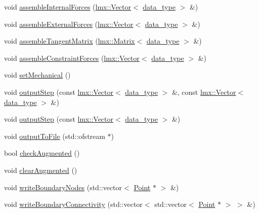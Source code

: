 \begin{DoxyCompactItemize}
\item 
void \hyperlink{classmknix_1_1_system_a045a56838910627b66dc981205358b78}{assemble\+Internal\+Forces} (\hyperlink{classlmx_1_1_vector}{lmx\+::\+Vector}$<$ \hyperlink{namespacemknix_a16be4b246fbf2cceb141e3a179111020}{data\+\_\+type} $>$ \&)
\item 
void \hyperlink{classmknix_1_1_system_a3f8ef449040805bcc58e3a36a6276888}{assemble\+External\+Forces} (\hyperlink{classlmx_1_1_vector}{lmx\+::\+Vector}$<$ \hyperlink{namespacemknix_a16be4b246fbf2cceb141e3a179111020}{data\+\_\+type} $>$ \&)
\item 
void \hyperlink{classmknix_1_1_system_a4311a423d3a9d7072c0d49031e3bba32}{assemble\+Tangent\+Matrix} (\hyperlink{classlmx_1_1_matrix}{lmx\+::\+Matrix}$<$ \hyperlink{namespacemknix_a16be4b246fbf2cceb141e3a179111020}{data\+\_\+type} $>$ \&)
\item 
void \hyperlink{classmknix_1_1_system_a24b1a9bcb9279bbb2384d2bbf94b157c}{assemble\+Constraint\+Forces} (\hyperlink{classlmx_1_1_vector}{lmx\+::\+Vector}$<$ \hyperlink{namespacemknix_a16be4b246fbf2cceb141e3a179111020}{data\+\_\+type} $>$ \&)
\item 
void \hyperlink{classmknix_1_1_system_ad884fcd0fba58c799a88de4ee1f59108}{set\+Mechanical} ()
\item 
void \hyperlink{classmknix_1_1_system_a22677dbc55080b00290652416ee8bb90}{output\+Step} (const \hyperlink{classlmx_1_1_vector}{lmx\+::\+Vector}$<$ \hyperlink{namespacemknix_a16be4b246fbf2cceb141e3a179111020}{data\+\_\+type} $>$ \&, const \hyperlink{classlmx_1_1_vector}{lmx\+::\+Vector}$<$ \hyperlink{namespacemknix_a16be4b246fbf2cceb141e3a179111020}{data\+\_\+type} $>$ \&)
\item 
void \hyperlink{classmknix_1_1_system_ac161fd48c06a65cfa7b9e27dfbad3f47}{output\+Step} (const \hyperlink{classlmx_1_1_vector}{lmx\+::\+Vector}$<$ \hyperlink{namespacemknix_a16be4b246fbf2cceb141e3a179111020}{data\+\_\+type} $>$ \&)
\item 
void \hyperlink{classmknix_1_1_system_af08300f28c64abfc4065888a643b4bbf}{output\+To\+File} (std\+::ofstream $\ast$)
\item 
bool \hyperlink{classmknix_1_1_system_a477db1887fa5858d2708f50397aa6ebf}{check\+Augmented} ()
\item 
void \hyperlink{classmknix_1_1_system_afbf67e600535664daa11f57170ce28b1}{clear\+Augmented} ()
\item 
void \hyperlink{classmknix_1_1_system_afeb45ebb36f1912aaaaa323b50bac80d}{write\+Boundary\+Nodes} (std\+::vector$<$ \hyperlink{classmknix_1_1_point}{Point} $\ast$ $>$ \&)
\item 
void \hyperlink{classmknix_1_1_system_a9175f3a34d6a43a79b7fe00cde18f128}{write\+Boundary\+Connectivity} (std\+::vector$<$ std\+::vector$<$ \hyperlink{classmknix_1_1_point}{Point} $\ast$ $>$ $>$ \&)
\end{DoxyCompactItemize}

